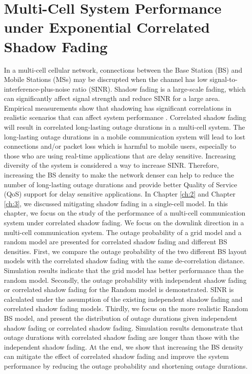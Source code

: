 \chapter{Multi-Cell System Performance under Exponential Correlated Shadow Fading}\label{ch:4}
 \par In a multi-cell cellular network, connections between the Base Station (BS) and Mobile Stations (MSs) may be discrupted when the channel has low signal-to-interference-plus-noise ratio (SINR). Shadow fading is a large-scale fading, which can significantly affect signal strength and reduce SINR for a large area. Empirical measurements show that shadowing has significant correlations in realistic scenarios that can affect system performance \cite{graziano1978propagation}. Correlated shadow fading will result in correlated long-lasting outage durations in a multi-cell system. The long-lasting outage durations in a mobile communication system will lead to lost connections and/or packet loss which is harmful to mobile users, especially to those who are using real-time applications that are delay sensitive. Increasing diversity of the system is considered a way to increase SINR. Therefore, increasing the BS density to make the network denser can help to reduce the number of long-lasting outage durations and provide better Quality of Service (QoS) support for delay sensitive applications. In Chapter \ref{ch:2} and Chapter \ref{ch:3}, we discussed mitigating shadow fading in a single-cell model. In this chapter, we focus on the study of the performance of a multi-cell communication system under correlated shadow fading. We focus on the downlink direction in a multi-cell communication system. The outage probability of a grid model and a random model are presented for correlated shadow fading and different BS densities. First, we compare the outage probability of the two different BS layout models with the correlated shadow fading with the same de-correlation distance. Simulation results indicate that the grid model has better performance than the random model. Secondly, the outage probability with independent shadow fading or correlated shadow fading for the Random model is demonstrated. SINR is calculated under the assumption of the existing independent shadow fading and correlated shadow fading models. Thirdly, we focus on the more realistic Random BS model, and present the distribution of outage durations given independent shadow fading or correlated shadow fading. Simulation results demonstrate that outage durations with correlated shadow fading are longer than those with the independent shadow fading. At the end, we show that increasing the BS density can mitigate the effect of correlated shadow fading and improve the system performance by reducing the outage probability and shortening outage durations. 
 
